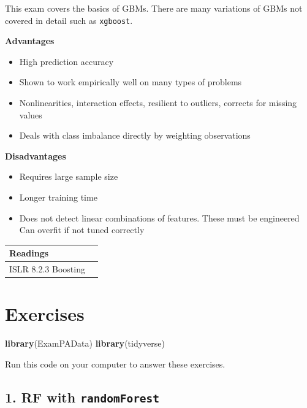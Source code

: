 \documentclass[
  openany]{book}
\newenvironment{Shaded}{\begin{snugshade}}{\end{snugshade}}
\newcommand{\KeywordTok}[1]{\textcolor[rgb]{0.13,0.29,0.53}{\textbf{#1}}}
\newcommand{\NormalTok}[1]{#1}
\providecommand{\tightlist}{%
  \setlength{\itemsep}{0pt}\setlength{\parskip}{0pt}}
\begin{document}
This exam covers the basics of GBMs. There are many variations of GBMs not covered in detail such as \texttt{xgboost}.

\textbf{Advantages}

\begin{itemize}
\tightlist
\item
  High prediction accuracy
\item
  Shown to work empirically well on many types of problems
\item
  Nonlinearities, interaction effects, resilient to outliers, corrects for missing values
\item
  Deals with class imbalance directly by weighting observations
\end{itemize}

\textbf{Disadvantages}

\begin{itemize}
\tightlist
\item
  Requires large sample size
\item
  Longer training time
\item
  Does not detect linear combinations of features. These must be engineered
  Can overfit if not tuned correctly
\end{itemize}

\begin{longtable}[]{@{}ll@{}}
\toprule
Readings &\tabularnewline
\midrule
\endhead
ISLR 8.2.3 Boosting &\tabularnewline
\bottomrule
\end{longtable}

\hypertarget{exercises-1}{%
\section{Exercises}\label{exercises-1}}

\begin{Shaded}
\begin{Highlighting}[]
\KeywordTok{library}\NormalTok{(ExamPAData)}
\KeywordTok{library}\NormalTok{(tidyverse)}
\end{Highlighting}
\end{Shaded}

Run this code on your computer to answer these exercises.

\hypertarget{rf-with-randomforest}{%
\subsection{\texorpdfstring{1. RF with \texttt{randomForest}}{1. RF with randomForest}}\label{rf-with-randomforest}}
\end{document}
